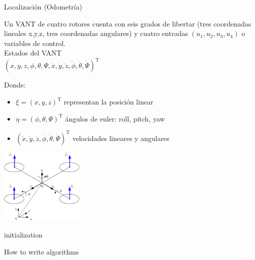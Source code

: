 \documentclass[
  24pt, %
  aspectratio=169, %
]{beamer}
\begin{document}
\begin{frame}{Localización (Odometría)}
  
  \begin{minipage}{0.47\textwidth}
    
    \small Un VANT de cuatro rotores cuenta con seis grados de libertar (tres coordenadas lineales x,y,z, tres coordenadas angulares) y cuatro entradas $(u_1,u_2,u_3,u_4)$ o variables de control.\\
    
    Estados del VANT \\
    $(x,y,z,\phi,\theta,\Psi,\dot{x},\dot{y},\dot{z},\dot{\phi},\dot{\theta},\dot{\Psi})^\mathrm{T}$

    \bigskip %
    
    Donde:
    \begin{itemize}
    \item $\xi = (x,y,z)^\mathrm{T}$ representan la posición linear
    \item $\eta = (\phi,\theta,\Psi)^\mathrm{T}$ ángulos de euler: roll, pitch, yaw
    \item $(\dot{x},\dot{y},\dot{z},\dot{\phi},\dot{\theta},\dot{\Psi})^\mathrm{T}$ velocidades lineares y angulares
    \end{itemize}
  \end{minipage}
  \hspace{0.2cm}
  \begin{minipage}{0.5\textwidth}
    \centering
    \includegraphics[width=4cm]{uav_model.jpeg}
    \bigskip %
  \end{minipage}
\end{frame}

\begin{frame}
  \begin{algorithm}[H]
    initialization\;
    \caption{How to write algorithms}
  \end{algorithm}
\end{frame}
\end{document}
